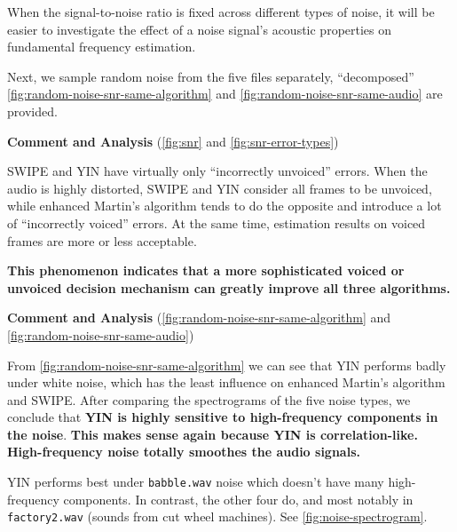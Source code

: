 \documentclass[11pt,a4paper]{report}
\begin{document}
When the signal-to-noise ratio is fixed across different types of noise, it will be easier to investigate the effect of a noise signal's acoustic properties on fundamental frequency estimation.

Next, we sample random noise from the five files separately, \enquote{decomposed} \autoref{fig:random-noise-snr-same-algorithm} and \autoref{fig:random-noise-snr-same-audio} are provided.

\begin{mdframed}
\textbf{Comment and Analysis} (\autoref{fig:snr} and \autoref{fig:snr-error-types})

\bigskip

SWIPE and YIN have virtually only \enquote{incorrectly unvoiced} errors.
When the audio is highly distorted, SWIPE and YIN consider all frames to be unvoiced, while enhanced Martin's algorithm tends to do the opposite and introduce a lot of \enquote{incorrectly voiced} errors.
At the same time, estimation results on voiced frames are more or less acceptable.

\textbf{This phenomenon indicates that a more sophisticated voiced or unvoiced decision mechanism can greatly improve all three algorithms.}
\end{mdframed}

\begin{mdframed}
\textbf{Comment and Analysis} (\autoref{fig:random-noise-snr-same-algorithm} and \autoref{fig:random-noise-snr-same-audio})

From \autoref{fig:random-noise-snr-same-algorithm} we can see that YIN performs badly under white noise, which has the least influence on enhanced Martin's algorithm and SWIPE\@.
After comparing the spectrograms of the five noise types, we conclude that \textbf{YIN is highly sensitive to high-frequency components in the noise}.
\textbf{This makes sense again because YIN is correlation-like.
High-frequency noise totally smoothes the audio signals.}

YIN performs best under \texttt{babble.wav} noise which doesn't have many high-frequency components.
In contrast, the other four do, and most notably in \texttt{factory2.wav} (sounds from cut wheel machines).
See \autoref{fig:noise-spectrogram}.
\end{mdframed}
\end{document}
